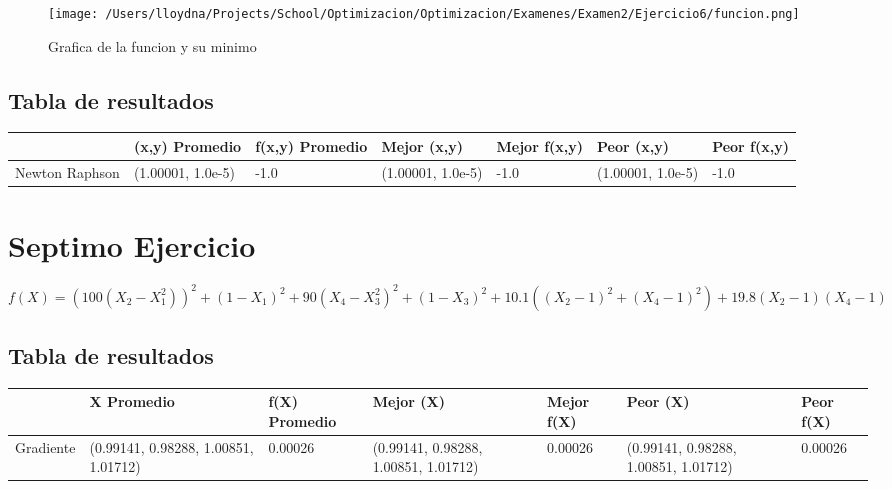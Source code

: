 \documentclass{report}
\begin{document}
            \begin{figure}[H]
                \texttt{[image: /Users/lloydna/Projects/School/Optimizacion/Optimizacion/Examenes/Examen2/Ejercicio6/funcion.png]}
                \caption{Grafica de la funcion y su minimo}
                \label{fig:fun16}
            \end{figure}

            \subsection{Tabla de resultados}
                \begin{tabular}{l|p{1.5cm}|p{1.5cm}|p{1.5cm}|p{1.5cm}|p{1.5cm}|p{1.5cm}}
                    & (x,y) Promedio & f(x,y) Promedio & Mejor (x,y) & Mejor f(x,y) & Peor (x,y) & Peor f(x,y)\\
                    \hline
                    Newton Raphson & (1.00001, 1.0e-5) & -1.0 & (1.00001, 1.0e-5) & -1.0 & (1.00001, 1.0e-5) & -1.0\\
                    \hline
                \end{tabular}
        \pagebreak

        \section{Septimo Ejercicio}
            \begin{equation*}
                f(X)=(100(X_{2}-X_{1}^2))^2+(1-X_{1})^2+90(X_{4}-X_{3}^2)^2+(1-X_{3})^2+10.1((X_{2}-1)^2+(X_{4}-1)^2)+19.8(X_{2}-1)(X_{4}-1)
            \end{equation*}

            \subsection{Tabla de resultados}
                \begin{tabular}{l|p{1.5cm}|p{1.5cm}|p{1.5cm}|p{1.5cm}|p{1.5cm}|p{1.5cm}}
                    & X Promedio & f(X) Promedio & Mejor (X) & Mejor f(X) & Peor (X) & Peor f(X)\\
                    \hline
                    Gradiente & (0.99141, 0.98288, 1.00851, 1.01712) & 0.00026 & (0.99141, 0.98288, 1.00851, 1.01712) & 0.00026 & (0.99141, 0.98288, 1.00851, 1.01712) & 0.00026\\
                    \hline
                \end{tabular}
\end{document}
